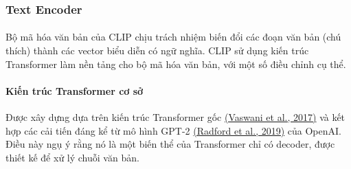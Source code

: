 \subsubsection{Text Encoder}
\paragraph{}{Bộ mã hóa văn bản của CLIP chịu trách nhiệm biến đổi các đoạn văn bản (chú thích) thành các vector biểu diễn có ngữ nghĩa. CLIP sử dụng kiến trúc Transformer làm nền tảng cho bộ mã hóa văn bản, với một số điều chỉnh cụ thể.}
\paragraph{Kiến trúc Transformer cơ sở} Được xây dựng dựa trên kiến trúc Transformer gốc \hyperref[transformer]{(Vaswani et al., 2017)} và kết hợp các cải tiến đáng kể từ mô hình GPT-2 \hyperref[gpt2]{(Radford et al., 2019)} của OpenAI. Điều này ngụ ý rằng nó là một biến thể của Transformer chỉ có decoder, được thiết kế để xử lý chuỗi văn bản.
